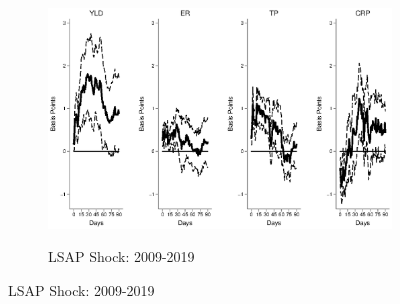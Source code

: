 \documentclass{article}
\begin{document}
\begin{figure}[tbph]
	\begin{subfigure}[t]{\textwidth}
		\begin{center}
			\includegraphics[trim={0cm 0cm 0cm 0cm},clip,height=0.26\textheight,width=1\textwidth]{../Figures/LPs/LagDep-FX/LSAP/EM/LSAPEMnomyptpphi120m.eps} \\
			\caption{LSAP Shock: 2009-2019} \label{subfig:LPEM10Ylsap}
		\end{center}
	\end{subfigure}
	
\end{figure}
\end{document}
